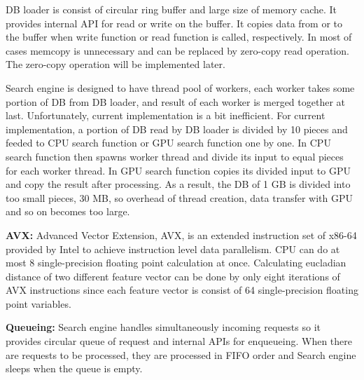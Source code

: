 

DB loader is consist of circular ring buffer and large size of memory cache.
It provides internal API for read or write on the buffer.
It copies data from or to the buffer when write function or read function is called, respectively.
In most of cases memcopy is unnecessary and can be replaced by zero-copy read operation.
The zero-copy operation will be implemented later.

Search engine is designed to have thread pool of workers, each worker takes some portion of DB from DB loader, and result of each worker is merged together at last.
Unfortunately, current implementation is a bit inefficient.
For current implementation, a portion of DB read by DB loader is divided by 10 pieces and feeded to CPU search function or GPU search function one by one.
In CPU search function then spawns worker thread and divide its input to equal pieces for each worker thread.
In GPU search function copies its divided input to GPU and copy the result after processing.
As a result, the DB of 1 GB is divided into too small pieces, 30 MB, so overhead of thread creation, data transfer with GPU and so on becomes too large.

\textbf{AVX:}
Advanced Vector Extension, AVX, is an extended instruction set of x86-64 provided by Intel to achieve instruction level data parallelism.
CPU can do at most 8 single-precision floating point calculation at once.
Calculating eucladian distance of two different feature vector can be done by only eight iterations of AVX instructions since each feature vector is consist of 64 single-precision floating point variables.



\textbf{Queueing:}
Search engine handles simultaneously incoming requests so it provides circular queue of request and internal APIs for enqueueing.
When there are requests to be processed, they are processed in FIFO order and Search engine sleeps when the queue is empty.

